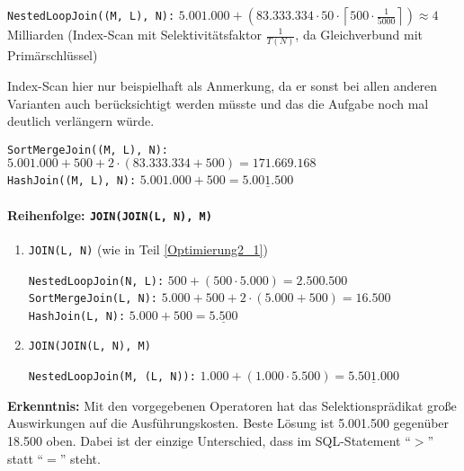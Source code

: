 \begin{enumerate}[a)]
\begin{enumerate}[i)]
\begin{solution}
\begin{enumerate}[1.]
\begin{note}
			\texttt{NestedLoopJoin((M, L), N):} $5.001.000 + (83.333.334 \cdot 50 \cdot \left \lceil{ 500 \cdot \frac{1}{5000} }\right \rceil ) \approx 4$ Milliarden (Index-Scan mit Selektivitätsfaktor $\frac{1}{T(N)}$, da Gleichverbund mit Primärschlüssel)

			Index-Scan hier nur beispielhaft als Anmerkung, da er sonst bei allen anderen Varianten auch berücksichtigt werden müsste und das die Aufgabe noch mal deutlich verlängern würde.
			\end{note}

			  \texttt{SortMergeJoin((M, L), N):} $5.001.000 + 500 + 2 \cdot (83.333.334 + 500) = 171.669.168$ \\
			  \texttt{HashJoin((M, L), N):} $5.001.000 + 500 = \underline{5.001.500}$

		\end{enumerate}

		\paragraph{\color{solutioncolor}Reihenfolge: \texttt{JOIN(JOIN(L, N), M)}}

		\begin{enumerate}[1.]

			\item \texttt{JOIN(L, N)} (wie in Teil \ref{Optimierung2_1})

			  \texttt{NestedLoopJoin(N, L):} $500 + (500 \cdot 5.000) = 2.500.500$ \\
			  \texttt{SortMergeJoin(L, N):} $5.000 +500 + 2 \cdot (5.000 + 500) = 16.500$ \\
			  \texttt{HashJoin(L, N):} $5.000 + 500 = \underline{5.500}$ \\

			\item \texttt{JOIN(JOIN(L, N), M)}

			  \texttt{NestedLoopJoin(M, (L, N)):} $1.000 + (1.000 \cdot 5.500) = \underline{5.501.000}$

		\end{enumerate}

		\textbf{Erkenntnis:} Mit den vorgegebenen Operatoren hat das Selektionsprädikat große Auswirkungen auf die Ausführungskosten.
		Beste Lösung ist 5.001.500 gegenüber 18.500 oben.
		Dabei ist der einzige Unterschied, dass im SQL-Statement "`$>$"' statt "`$=$"' steht.

		\end{solution}

	\end{enumerate}

\end{enumerate}
